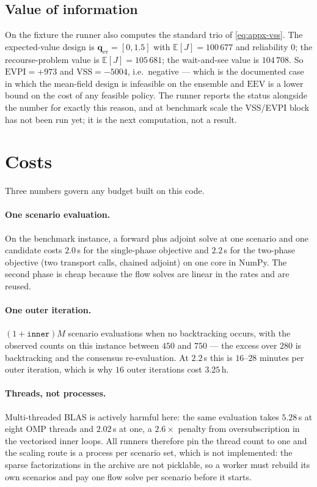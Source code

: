 \documentclass[11pt]{article}
\newcommand{\E}{\mathbb{E}}
\newcommand{\qq}{\mathbf{q}}
\begin{document}
\subsection{Value of information}

On the fixture the runner also computes the standard trio of
\eqref{eq:appx-vss}. The expected-value design is
$\qq_{\text{ev}}=[0,1.5]$ with $\E[J]=100\,677$ and reliability $0$; the
recourse-problem value is $\E[J]=105\,681$; the wait-and-see value is
$104\,708$. So $\mathrm{EVPI}=+973$ and $\mathrm{VSS}=-5004$, i.e.\ negative ---
which is the documented case in which the mean-field design is infeasible on the
ensemble and $\mathrm{EEV}$ is a lower bound on the cost of any feasible policy.
The runner reports the status alongside the number for exactly this reason, and
at benchmark scale the VSS/EVPI block has not been run yet; it is the next
computation, not a result.

\section{Costs}
\label{sec:appx-cost}

Three numbers govern any budget built on this code.

\paragraph{One scenario evaluation.} On the benchmark instance, a forward plus
adjoint solve at one scenario and one candidate costs $2.0$\,s for the
single-phase objective and $2.2$\,s for the two-phase objective (two transport
calls, chained adjoint) on one core in NumPy. The second phase is cheap because
the flow solves are linear in the rates and are reused.

\paragraph{One outer iteration.} $(1+\texttt{inner})M$ scenario evaluations when
no backtracking occurs, with the observed counts on this instance between $450$
and $750$ --- the excess over $280$ is backtracking and the consensus
re-evaluation. At $2.2$\,s this is $16$--$28$ minutes per outer iteration, which
is why $16$ outer iterations cost $3.25$\,h.

\paragraph{Threads, not processes.} Multi-threaded BLAS is actively harmful here:
the same evaluation takes $5.28$\,s at eight OMP threads and $2.02$\,s at one, a
$2.6\times$ penalty from oversubscription in the vectorised inner loops. All
runners therefore pin the thread count to one and the scaling route is a process
per scenario set, which is not implemented: the sparse factorizations in the
archive are not picklable, so a worker must rebuild its own scenarios and pay one
flow solve per scenario before it starts.
\end{document}
